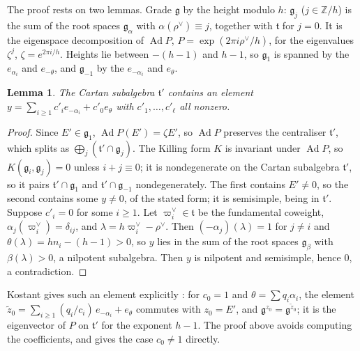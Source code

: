 \documentclass[11pt,a4paper]{amsart}
\newtheorem{lemma}[theorem]{Lemma}
\theoremstyle{definition}
\theoremstyle{remark}
\begin{document}
The proof rests on two lemmas. Grade $\mathfrak g$ by the height modulo $h$: $\mathfrak g_j$ ($j \in \mathbb Z/h$) is the sum of the root spaces $\mathfrak g_\alpha$ with $\alpha(\rho^\vee) \equiv j$, together with $\mathfrak t$ for $j = 0$. It is the eigenspace decomposition of $\operatorname{Ad}P$, $P = \exp(2\pi i\rho^\vee/h)$, for the eigenvalues $\zeta^j$, $\zeta = e^{2\pi i/h}$. Heights lie between $-(h-1)$ and $h-1$, so $\mathfrak g_1$ is spanned by the $e_{\alpha_i}$ and $e_{-\theta}$, and $\mathfrak g_{-1}$ by the $e_{-\alpha_i}$ and $e_{\theta}$.

\begin{lemma}\label{lem:dual}
The Cartan subalgebra $\mathfrak t'$ contains an element $y = \sum_{i\ge1} c'_i e_{-\alpha_i} + c'_0 e_\theta$ with $c'_1,\dots,c'_\ell$ all nonzero.
\end{lemma}
\begin{proof}
Since $E' \in \mathfrak g_1$, $\operatorname{Ad}P(E') = \zeta E'$, so $\operatorname{Ad}P$ preserves the centraliser $\mathfrak t'$, which splits as $\bigoplus_j (\mathfrak t' \cap \mathfrak g_j)$. The Killing form $K$ is invariant under $\operatorname{Ad}P$, so $K(\mathfrak g_i, \mathfrak g_j) = 0$ unless $i + j \equiv 0$; it is nondegenerate on the Cartan subalgebra $\mathfrak t'$, so it pairs $\mathfrak t'\cap\mathfrak g_1$ and $\mathfrak t'\cap\mathfrak g_{-1}$ nondegenerately. The first contains $E' \neq 0$, so the second contains some $y \neq 0$, of the stated form; it is semisimple, being in $\mathfrak t'$. Suppose $c'_i = 0$ for some $i \ge 1$. Let $\varpi_i^\vee \in \mathfrak t$ be the fundamental coweight, $\alpha_j(\varpi_i^\vee) = \delta_{ij}$, and $\lambda = h\varpi_i^\vee - \rho^\vee$. Then $(-\alpha_j)(\lambda) = 1$ for $j \neq i$ and $\theta(\lambda) = h n_i - (h-1) > 0$, so $y$ lies in the sum of the root spaces $\mathfrak g_\beta$ with $\beta(\lambda) > 0$, a nilpotent subalgebra. Then $y$ is nilpotent and semisimple, hence $0$, a contradiction.
\end{proof}

Kostant gives such an element explicitly \cite[Thm~6.7]{kostant}: for $c_0 = 1$ and $\theta = \sum q_i\alpha_i$, the element $\tilde z_0 = \sum_{i\ge1}(q_i/c_i)\,e_{-\alpha_i} + e_\theta$ commutes with $z_0 = E'$, and $\mathfrak g^{z_0} = \mathfrak g^{\tilde z_0}$; it is the eigenvector of $P$ on $\mathfrak t'$ for the exponent $h-1$. The proof above avoids computing the coefficients, and gives the case $c_0 \neq 1$ directly.
\end{document}
